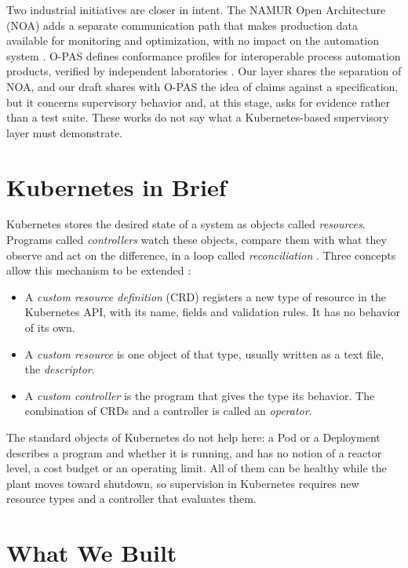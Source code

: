 \documentclass[conference]{IEEEtran}
\begin{document}
Two industrial initiatives are closer in intent. The NAMUR Open Architecture (NOA) adds a separate communication path that makes production data available for monitoring and optimization, with no impact on the automation system \cite{NE175}. O-PAS defines conformance profiles for interoperable process automation products, verified by independent laboratories \cite{OPAS}. Our layer shares the separation of NOA, and our draft shares with O-PAS the idea of claims against a specification, but it concerns supervisory behavior and, at this stage, asks for evidence rather than a test suite. These works do not say what a Kubernetes-based supervisory layer must demonstrate.

\section{Kubernetes in Brief}

Kubernetes stores the desired state of a system as objects called \textit{resources}. Programs called \textit{controllers} watch these objects, compare them with what they observe and act on the difference, in a loop called \textit{reconciliation} \cite{Burns2016}. Three concepts allow this mechanism to be extended \cite{K8sOperator}:
\begin{itemize}
\item A \textit{custom resource definition} (CRD) registers a new type of resource in the Kubernetes API, with its name, fields and validation rules. It has no behavior of its own.
\item A \textit{custom resource} is one object of that type, usually written as a text file, the \textit{descriptor}.
\item A \textit{custom controller} is the program that gives the type its behavior. The combination of CRDs and a controller is called an \textit{operator}.
\end{itemize}

The standard objects of Kubernetes do not help here: a Pod or a Deployment describes a program and whether it is running, and has no notion of a reactor level, a cost budget or an operating limit. All of them can be healthy while the plant moves toward shutdown, so supervision in Kubernetes requires new resource types and a controller that evaluates them.

\section{What We Built}
\end{document}
